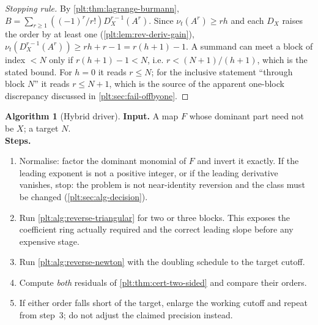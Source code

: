 \documentclass[11pt,oneside]{article}
\theoremstyle{plain}
\theoremstyle{definition}
\newtheorem{algorithm}[theorem]{Algorithm}
\theoremstyle{remark}
\newcommand{\ordt}{\nu_{t}}                              %
\newcommand{\DX}{D_{X}}                                  %
\begin{document}
\begin{proof}[Stopping rule]
By \cref{plt:thm:lagrange-burmann}, \(B=\sum_{r\ge1}((-1)^r/r!)\DX^{r-1}(A^r)\).
Since \(\ordt(A^r)\ge rh\) and each \(\DX\) raises the order by at least one
(\cref{plt:lem:rev-deriv-gain}), \(\ordt(\DX^{r-1}(A^r))\ge rh+r-1=r(h+1)-1\).
A summand can meet a block of index \(<N\) only if \(r(h+1)-1<N\), i.e.
\(r<(N+1)/(h+1)\), which is the stated bound.  For \(h=0\) it reads \(r\le N\);
for the inclusive statement ``through block \(N\)'' it reads \(r\le N+1\), which
is the source of the apparent one-block discrepancy discussed in
\cref{plt:sec:fail-offbyone}.
\end{proof}

\begin{algorithm}[Hybrid driver]\label{plt:alg:reverse-hybrid}
\textbf{Input.}  A map \(F\) whose dominant part need not be \(X\); a target
\(N\).\\
\textbf{Steps.}
\begin{enumerate}
\item Normalise: factor the dominant monomial of \(F\) and invert it exactly.
      If the leading exponent is not a positive integer, or if the leading
      derivative vanishes, stop: the problem is not near-identity reversion and
      the class must be changed (\cref{plt:sec:alg-decision}).
\item Run \cref{plt:alg:reverse-triangular} for two or three blocks.  This
      exposes the coefficient ring actually required and the correct leading
      slope before any expensive stage.
\item Run \cref{plt:alg:reverse-newton} with the doubling schedule to the
      target cutoff.
\item Compute \emph{both} residuals of \cref{plt:thm:cert-two-sided} and
      compare their orders.
\item If either order falls short of the target, enlarge the working cutoff and
      repeat from step~3; do not adjust the claimed precision instead.
\end{enumerate}
\end{algorithm}
\end{document}
